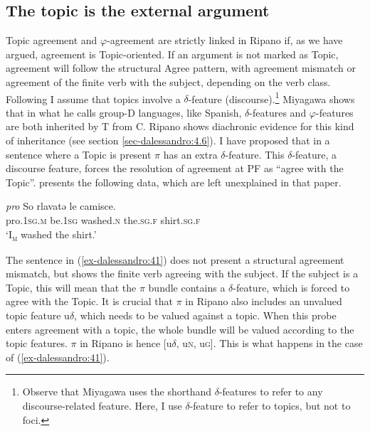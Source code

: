 \documentclass[output=paper
,modfonts
,nonflat]{langsci/langscibook}
\begin{document}
\subsection{The topic is the external argument}\label{sec-dalessandro:5.1}
Topic agreement and $\varphi $-agreement are strictly linked in Ripano if, as we have argued, agreement is Topic-oriented. If an argument is not marked as Topic, agreement will follow the structural Agree pattern, with agreement mismatch or agreement of the finite verb with the subject, depending on the verb class. Following \citet{Miyagawa2017} I assume that topics involve a $\delta $-feature (discourse).\footnote{Observe that Miyagawa uses the shorthand $\delta $-features to refer to any discourse-related feature. Here, I use $\delta $-feature to refer to topics, but not to foci.} Miyagawa shows that in what he calls group-D languages, like Spanish, $\delta $-features and $\varphi $-features are both inherited by T from C. Ripano shows diachronic evidence for this kind of inheritance (see section \ref{sec-dalessandro:4.6}). 
I have proposed that in a sentence where a Topic is present $\pi $ has an extra $\delta $-feature. This $\delta $-feature, a discourse feature, forces the resolution of agreement at PF as “agree with the Topic”. \citet{D`Alessandro2017} presents the following data, which are left unexplained in that paper.

\begin{exe}
\ex \label{ex-dalessandro:40}
\gll \textit{pro} So rlavatə le camisce.\\
pro.1\textsc{sg.m} be.\textsc{1sg} washed.\textsc{n} the.\textsc{sg.f} shirt.\textsc{sg.f}\\
\glt `I\textsubscript{\textsc{m}} washed the shirt.'
\end{exe}
\begin{exe}
	 \label{ex-dalessandro:41}
\end{exe}
The sentence in (\ref{ex-dalessandro:41}) does not present a structural agreement mismatch, but shows the finite verb agreeing with the subject. If the subject is a Topic, this will mean that the $\pi $ bundle contains a $\delta $-feature, which is forced to agree with the Topic. 
It is crucial that $\pi $ in Ripano also includes an unvalued topic feature u$\delta $, which needs to be valued against a topic. When this probe enters agreement with a topic, the whole bundle will be valued according to the topic features. $\pi $ in Ripano is hence [u$\delta $, u\textsc{n,} u\textsc{g].} This is what happens in the case of (\ref{ex-dalessandro:41}).
\end{document}
